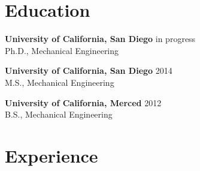 \documentclass[]{res}
\begin{document}
\address{\textbf{David P. Larson} \\
    9500 Gilman Drive \#0411 \\
    La Jolla, CA 92093--0411
}
\address{\hfill \href{mailto:dplarson@ucsd.edu}{dplarson@ucsd.edu} \\
    \hfill \url{http://ieng6.ucsd.edu/~dplarson} \\
    \hfill \url{http://github.com/dplarson}
}

\begin{resume}


\section{Education}
\vspace{0.1in}

\textbf{University of California, San Diego} \hfill in progress \\
Ph.D., Mechanical Engineering \\

\vspace{-0.2in}

\textbf{University of California, San Diego} \hfill 2014 \\
M.S., Mechanical Engineering \\

\vspace{-0.2in}

\textbf{University of California, Merced} \hfill 2012 \\
B.S., Mechanical Engineering


\section{Experience}
\vspace{0.1in}


\end{resume}
\end{document}
